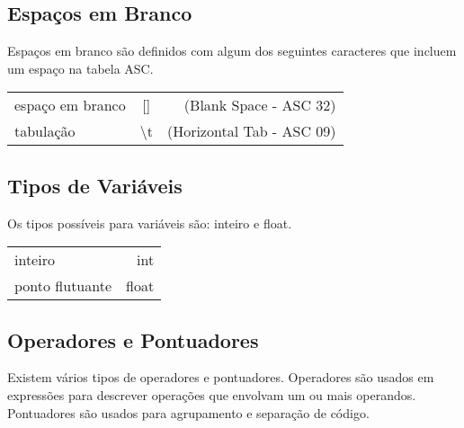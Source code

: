 \documentclass[a4paper,10pt]{article}
\begin{document}
  \subsection{Espa\c{c}os em Branco}
  Espa\c{c}os em branco s\~{a}o definidos com algum dos seguintes caracteres que incluem um espa\c{c}o na tabela ASC.
  \begin{center}
  \begin{tabular}{| l | c | r |}
    \hline
    espa\c{c}o em branco & [] & (Blank Space - ASC 32) \\
    tabula\c{c}\~{a}o & \textbackslash t & (Horizontal Tab - ASC 09) \\
    \hline
  \end{tabular}
  \end{center}	

  \subsection{Tipos de Vari\'aveis}
  Os tipos poss\'iveis para vari\'aveis s\~ao: inteiro e float.
  \begin{center}
  \begin{tabular}{| l | r |}
    \hline
    inteiro & int \\
    ponto flutuante & float\\
    \hline
  \end{tabular}
  \end{center}

  \subsection{Operadores e Pontuadores}
  Existem v\'arios tipos de operadores e pontuadores. Operadores s\~ao usados em express\~oes para descrever opera\c{c}\~{o}es que envolvam um ou mais operandos.
  Pontuadores s\~{a}o usados para agrupamento e separa\c{c}\~{a}o de c\'{o}digo.
  
\end{document}
